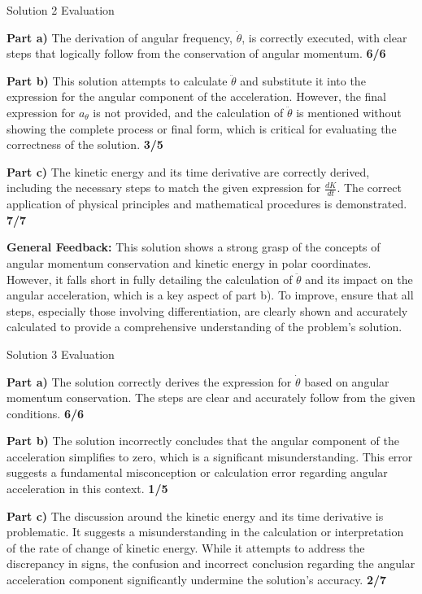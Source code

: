 \documentclass[a4paper,11pt]{article}
\begin{document}
Solution 2 Evaluation

\textbf{Part a)} The derivation of angular frequency, \( \dot{\theta} \), is correctly executed, with clear steps that logically follow from the conservation of angular momentum. \textbf{6/6}

\textbf{Part b)} This solution attempts to calculate \( \ddot{\theta} \) and substitute it into the expression for the angular component of the acceleration. However, the final expression for \( a_{\theta} \) is not provided, and the calculation of \( \ddot{\theta} \) is mentioned without showing the complete process or final form, which is critical for evaluating the correctness of the solution. \textbf{3/5}

\textbf{Part c)} The kinetic energy and its time derivative are correctly derived, including the necessary steps to match the given expression for \( \frac{dK}{dt} \). The correct application of physical principles and mathematical procedures is demonstrated. \textbf{7/7}

\textbf{General Feedback:} This solution shows a strong grasp of the concepts of angular momentum conservation and kinetic energy in polar coordinates. However, it falls short in fully detailing the calculation of \( \ddot{\theta} \) and its impact on the angular acceleration, which is a key aspect of part b). To improve, ensure that all steps, especially those involving differentiation, are clearly shown and accurately calculated to provide a comprehensive understanding of the problem's solution.

Solution 3 Evaluation

\textbf{Part a)} The solution correctly derives the expression for \( \dot{\theta} \) based on angular momentum conservation. The steps are clear and accurately follow from the given conditions. \textbf{6/6}

\textbf{Part b)} The solution incorrectly concludes that the angular component of the acceleration simplifies to zero, which is a significant misunderstanding. This error suggests a fundamental misconception or calculation error regarding angular acceleration in this context. \textbf{1/5}

\textbf{Part c)} The discussion around the kinetic energy and its time derivative is problematic. It suggests a misunderstanding in the calculation or interpretation of the rate of change of kinetic energy. While it attempts to address the discrepancy in signs, the confusion and incorrect conclusion regarding the angular acceleration component significantly undermine the solution's accuracy. \textbf{2/7}
\end{document}
